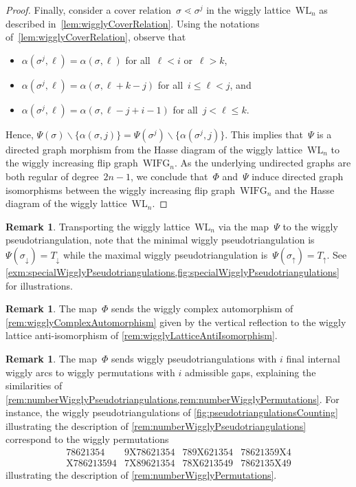 \documentclass{amsart}
\theoremstyle{definition}
\newtheorem{remark}[theorem]{Remark}
\newcommand{\ssm}{\smallsetminus} %
\newcommand{\wigglyIncreasingFlipGraph}{\mathrm{WIFG}} %
\newcommand{\wigglyLattice}{\mathrm{WL}} %
\begin{document}
\begin{proof}
\pagebreak
Finally, consider a cover relation~$\sigma \lessdot \sigma^j$ in the wiggly lattice~$\wigglyLattice_n$ as described in~\cref{lem:wigglyCoverRelation}.
Using the notations of~\cref{lem:wigglyCoverRelation}, observe that
\begin{itemize}
\item $\alpha(\sigma^j, \ell) = \alpha(\sigma, \ell)$ for all~$\ell < i$ or~$\ell > k$,
\item $\alpha(\sigma^j, \ell) = \alpha(\sigma, \ell+k-j)$ for all~$i \le \ell < j$, and
\item $\alpha(\sigma^j, \ell) = \alpha(\sigma, \ell-j+i-1)$ for all~$j < \ell \le k$.
\end{itemize}
Hence, $\Psi(\sigma) \ssm \{\alpha(\sigma, j)\} = \Psi(\sigma^j) \ssm \{\alpha(\sigma^j, j)\}$.
This implies that~$\Psi$ is a directed graph morphism from the Hasse diagram of the wiggly lattice~$\wigglyLattice_n$ to the wiggly increasing flip graph~$\wigglyIncreasingFlipGraph_n$.
As the underlying undirected graphs are both regular of degree~$2n-1$, we conclude that~$\Phi$ and~$\Psi$ induce directed graph isomorphisms between the wiggly increasing flip graph~$\wigglyIncreasingFlipGraph_n$ and the Hasse diagram of the wiggly lattice~$\wigglyLattice_n$.
\end{proof}

\begin{remark}
Transporting the wiggly lattice~$\wigglyLattice_n$ via the map~$\Psi$ to the wiggly pseudotriangulation, note that the minimal wiggly pseudotriangulation is~$\Psi(\sigma_\downarrow) = T_\downarrow$ while the maximal wiggly pseudotriangulation is~$\Psi(\sigma_\uparrow) = T_\uparrow$. See \cref{exm:specialWigglyPseudotriangulations,fig:specialWigglyPseudotriangulations} for illustrations.
\end{remark}

\begin{remark}
The map~$\Phi$ sends the wiggly complex automorphism of \cref{rem:wigglyComplexAutomorphism} given by the vertical reflection to the wiggly lattice anti-isomorphism of \cref{rem:wigglyLatticeAntiIsomorphism}.
\end{remark}

\begin{remark}
The map~$\Phi$ sends wiggly pseudotriangulations with $i$ final internal wiggly arcs to wiggly permutations with $i$ admissible gaps, explaining the similarities of \cref{rem:numberWigglyPseudotriangulations,rem:numberWigglyPermutations}.
For instance, the wiggly pseudotriangulations of \cref{fig:pseudotriangulationsCounting} illustrating the description of \cref{rem:numberWigglyPseudotriangulations} correspond to the wiggly permutations
\[
\begin{array}{cccc}
78621354 & 9\mathrm{X}78621354 & 789\mathrm{X}621354 & 78621359\mathrm{X}4 \\
\mathrm{X}786213594 & 7\mathrm{X}89621354 & 78\mathrm{X}6213549 & 7862135\mathrm{X}49
\end{array}
\]
illustrating the description of \cref{rem:numberWigglyPermutations}.
\end{remark}
\end{document}

